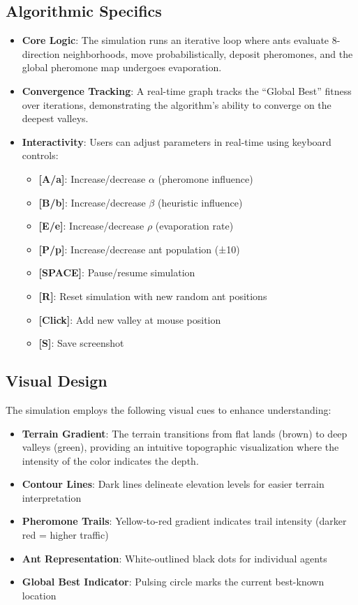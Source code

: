 \documentclass[12pt]{article}
\begin{document}
\subsection{Algorithmic Specifics}
\begin{itemize}
    \item \textbf{Core Logic}: The simulation runs an iterative loop where ants evaluate 8-direction neighborhoods, move probabilistically, deposit pheromones, and the global pheromone map undergoes evaporation.
    \item \textbf{Convergence Tracking}: A real-time graph tracks the ``Global Best'' fitness over iterations, demonstrating the algorithm's ability to converge on the deepest valleys.
    \item \textbf{Interactivity}: Users can adjust parameters in real-time using keyboard controls:
    \begin{itemize}
        \item \textbf{[A/a]}: Increase/decrease $\alpha$ (pheromone influence)
        \item \textbf{[B/b]}: Increase/decrease $\beta$ (heuristic influence)
        \item \textbf{[E/e]}: Increase/decrease $\rho$ (evaporation rate)
        \item \textbf{[P/p]}: Increase/decrease ant population (±10)
        \item \textbf{[SPACE]}: Pause/resume simulation
        \item \textbf{[R]}: Reset simulation with new random ant positions
        \item \textbf{[Click]}: Add new valley at mouse position
        \item \textbf{[S]}: Save screenshot
    \end{itemize}
\end{itemize}


\subsection{Visual Design}
The simulation employs the following visual cues to enhance understanding:
\begin{itemize}
    \item \textbf{Terrain Gradient}: The terrain transitions from flat lands (brown) to deep valleys (green), providing an intuitive topographic visualization where the intensity of the color indicates the depth.
    \item \textbf{Contour Lines}: Dark lines delineate elevation levels for easier terrain interpretation
    \item \textbf{Pheromone Trails}: Yellow-to-red gradient indicates trail intensity (darker red = higher traffic)
    \item \textbf{Ant Representation}: White-outlined black dots for individual agents
    \item \textbf{Global Best Indicator}: Pulsing circle marks the current best-known location
\end{itemize}
\end{document}
